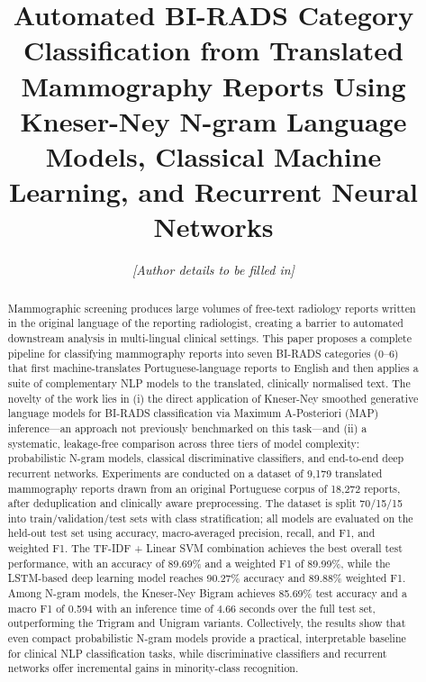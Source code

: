 \documentclass[11pt,a4paper]{article}
\title{%
  \textbf{Automated BI-RADS Category Classification from Translated
  Mammography Reports Using Kneser-Ney N-gram Language Models,
  Classical Machine Learning, and Recurrent Neural Networks}
}
\author{%
  \textit{[Author details to be filled in]}
}
\date{}
\begin{document}
\maketitle
\thispagestyle{empty}

\begin{abstract}
Mammographic screening produces large volumes of free-text radiology reports
written in the original language of the reporting radiologist, creating a
barrier to automated downstream analysis in multi-lingual clinical settings.
This paper proposes a complete pipeline for classifying mammography reports
into seven BI-RADS categories (0--6) that first machine-translates
Portuguese-language reports to English and then applies a suite of complementary
NLP models to the translated, clinically normalised text.
The novelty of the work lies in (i) the direct application of Kneser-Ney
smoothed generative language models for BI-RADS classification via Maximum
A-Posteriori (MAP) inference---an approach not previously benchmarked on this
task---and (ii) a systematic, leakage-free comparison across three tiers of
model complexity: probabilistic N-gram models, classical discriminative
classifiers, and end-to-end deep recurrent networks.
Experiments are conducted on a dataset of 9{,}179 translated mammography reports
drawn from an original Portuguese corpus of 18{,}272 reports, after
deduplication and clinically aware preprocessing.
The dataset is split 70/15/15 into train/validation/test sets with class
stratification; all models are evaluated on the held-out test set using
accuracy, macro-averaged precision, recall, and F1, and weighted F1.
The TF-IDF + Linear SVM combination achieves the best overall test performance,
with an accuracy of 89.69\% and a weighted F1 of 89.99\%, while the LSTM-based
deep learning model reaches 90.27\% accuracy and 89.88\% weighted F1.
Among N-gram models, the Kneser-Ney Bigram achieves 85.69\% test accuracy and
a macro F1 of 0.594 with an inference time of 4.66 seconds over the full test
set, outperforming the Trigram and Unigram variants.
Collectively, the results show that even compact probabilistic N-gram models
provide a practical, interpretable baseline for clinical NLP classification tasks,
while discriminative classifiers and recurrent networks offer incremental gains
in minority-class recognition.
\end{abstract}

\end{document}
